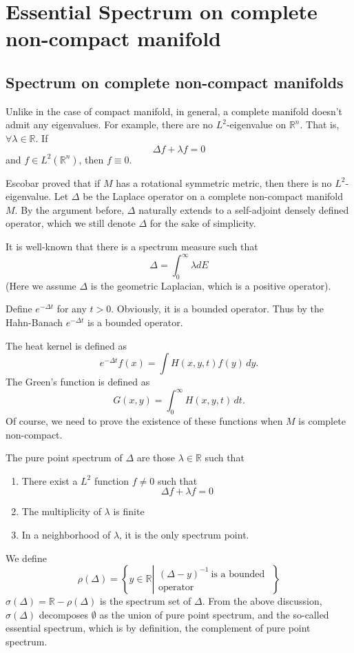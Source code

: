 

\chapter{Essential Spectrum on complete non-compact manifold}\label{Essential_spec}
\section{Spectrum on complete non-compact manifolds}\label{Spectrum_on_manifold}

Unlike in the case of compact manifold, in general, a complete manifold doesn't admit any eigenvalues. For example, there are no $ L^2$-eigenvalue on $\mathbb{R}^n$. That is, $ \forall \lambda \in \mathbb{R} $. If 
%
\[ \Delta f + \lambda f = 0 \]
%
and $ f \in L^2 (\mathbb{R}^n)$, then $ f \equiv 0$.

Escobar proved that if $M$ has a rotational symmetric metric, then there is no $ L^2$-eigenvalue. Let $ \Delta $ be the Laplace operator on a complete non-compact manifold $M$. By the argument before, $\Delta$ naturally extends to a self-adjoint densely defined operator, which we still denote $\Delta$ for the sake of simplicity.

It is well-known that there is a spectrum measure such that 
%
\[\Delta = \int^\infty _0 \lambda d E\]
(Here we assume $\Delta$ is the geometric Laplacian, which is a positive operator).

Define $ e^{-\Delta t} $ for any $ t > 0 $. Obviously, it is a bounded operator. Thus by the Hahn-Banach
$ e^{-\Delta t} $ is a bounded operator.

The heat kernel is defined as  
%
\[   e^{-\Delta t}   f(x) = \int H(x, y, t) f (y) \, dy.\]
%
The Green's function is defined as 
%
\[ G(x, y) = \int^\infty_0 H (x, y, t) \, dt .\]
Of course, we need to prove the existence of these functions when $M$ is complete non-compact.

The pure point spectrum of $ \Delta $ are those $ \lambda \in \mathbb{R} $ such that 
\begin{enumerate}
  \item There exist a $ L^2 $ function $ f \neq 0 $ such that 
   \[ \Delta f + \lambda f = 0 \]
  \item The multiplicity of $ \lambda $ is finite
  \item In a neighborhood of $ \lambda $, it is the only spectrum point.
 \end{enumerate} 
  We define 
%
\[ \rho (\Delta ) = \left\{ y \in \mathbb{R} \left| \begin{array}{r} (\Delta - y ) ^{-1} \ \mbox{is a bounded }\\
 \mbox{operator} \end{array} \right. \right\} \]
%
$ \sigma (\Delta ) = \mathbb{R} - \rho (\Delta) $ is the spectrum set of $ \Delta $. From the above discussion, $ \sigma (\Delta ) $ decomposes $ \emptyset $ as the union of pure point spectrum, and the so-called essential spectrum, which is by definition, the complement of pure point spectrum.

